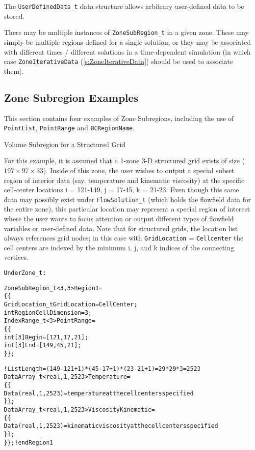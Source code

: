 The \texttt{UserDefinedData\_t} data structure
allows arbitrary user-defined data to be stored.

There may be multiple instances of \texttt{ZoneSubRegion\_t} in a given zone.
These may simply be multiple regions defined for a single solution,
or they may be associated with different times / different solutions in a
time-dependent simulation (in which case
\texttt{ZoneIterativeData} (\autoref{s:ZoneIterativeData}) should be
used to associate them).

\subsection{Zone Subregion Examples}
\label{s:zonesubregion_examples}

This section contains four examples of Zone Subregions, including
the use of \texttt{PointList}, \texttt{PointRange} and \texttt{BCRegionName}.

\begin{example}{Volume Subregion for a Structured Grid}
\label{ex:zonesubregion1}

For this example, it is assumed that a 1-zone 3-D structured grid exists
of size ($197 \times 97 \times 33$). Inside of this zone, the user wishes to output a
special subset region of interior data (say, temperature and kinematic viscosity)
at the specific cell-center locations i = 121-149, j = 17-45, k = 21-23.
Even though this same data may possibly exist under \texttt{FlowSolution\_t}
(which holds the flowfield data for the entire zone), this particular location
may represent a special region of interest where the user wants to focus attention
or output different types of flowfield variables or user-defined data.
Note that for structured grids, the location list always references grid nodes;
in this case with \texttt{GridLocation} = \texttt{Cellcenter} the cell centers
are indexed by the minimum i, j, and k indices of the connecting vertices.

\begin{alltt}
Under Zone\_t:

  ZoneSubRegion\_t<3,3> Region1 =
    \{\{
    GridLocation\_t GridLocation = CellCenter ;
    int RegionCellDimension = 3;
    IndexRange\_t<3> PointRange =
      \{\{
      int[3] Begin = [121,17,21];
      int[3] End = [149,45,21];
      \}\};

    ! ListLength = (149-121+1)*(45-17+1)*(23-21+1) = 29*29*3 = 2523
    DataArray\_t<real,1,2523> Temperature =
      \{\{
      Data(real,1,2523) = temperature at the cell centers specified
      \}\} ;
    DataArray\_t<real,1,2523> ViscosityKinematic =
      \{\{
      Data(real,1,2523) = kinematic viscosity at the cell centers specified
      \}\} ;
    \}\} ; ! end Region1
\end{alltt}

\end{example}

